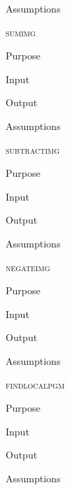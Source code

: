 \documentclass[pdftex, 11pt]{article}
\begin{document}
\begin{description}
\begin{description}
			\item{Assumptions}


		\end{description}



	\item{\textsc{sumimg}}
		\begin{description}
			\item{Purpose}


			\item{Input}


			\item{Output}


			\item{Assumptions}


		\end{description}



	\item{\textsc{subtractimg}}
		\begin{description}
			\item{Purpose}


			\item{Input}


			\item{Output}


			\item{Assumptions}


		\end{description}



	\item{\textsc{negateimg}}
		\begin{description}
			\item{Purpose}


			\item{Input}


			\item{Output}


			\item{Assumptions}


		\end{description}



	\item{\textsc{findlocalpgm}}
		\begin{description}
			\item{Purpose}


			\item{Input}


			\item{Output}


			\item{Assumptions}


		\end{description}


\end{description}
\end{document}
